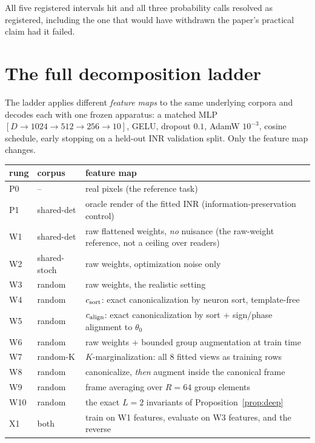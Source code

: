 All five registered intervals hit and all three probability calls resolved as registered, including
the one that would have withdrawn the paper's practical claim had it failed.


\section{The full decomposition ladder}\label{app:ladder}

The ladder applies different \emph{feature maps} to the same underlying corpora and decodes each
with one frozen apparatus: a matched MLP $[D \to 1024 \to 512 \to 256 \to 10]$, GELU, dropout
$0.1$, AdamW $10^{-3}$, cosine schedule, early stopping on a held-out INR validation split. Only
the feature map changes.

\begin{center}\small
\footnotesize\begin{tabular}{@{}llp{4.6cm}@{}}
\toprule
rung & corpus & feature map \\
\midrule
P0 & -- & real pixels (the reference task) \\
P1 & shared-det & oracle render of the fitted INR (information-preservation control) \\
W1 & shared-det & raw flattened weights, \emph{no} nuisance (the raw-weight reference, not a ceiling over readers) \\
W2 & shared-stoch & raw weights, optimization noise only \\
W3 & random & raw weights, the realistic setting \\
W4 & random & $c_{\mathrm{sort}}$: exact canonicalization by neuron sort, template-free \\
W5 & random & $c_{\mathrm{align}}$: exact canonicalization by sort $+$ sign/phase alignment to $\theta_0$ \\
W6 & random & raw weights $+$ bounded group augmentation at train time \\
W7 & random-K & $K$-marginalization: all 8 fitted views as training rows \\
W8 & random & canonicalize, \emph{then} augment inside the canonical frame \\
W9 & random & frame averaging over $R=64$ group elements \\
W10 & random & the exact $L{=}2$ invariants of Proposition~\ref{prop:deep} \\
X1 & both & train on W1 features, evaluate on W3 features, and the reverse \\
\bottomrule
\end{tabular}
\end{center}

